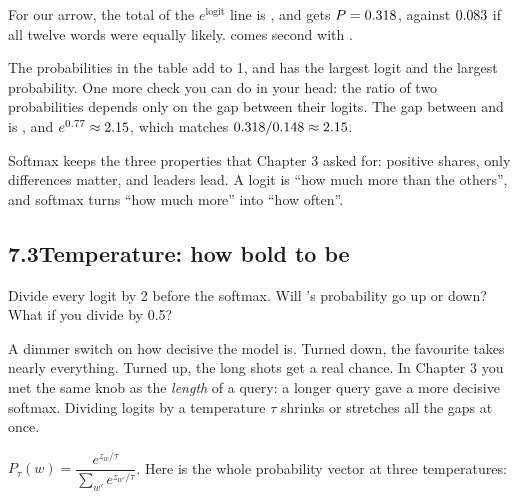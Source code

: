 For our arrow, the total of the $e^{\text{logit}}$ line is \nSevenExpSum, and  gets
$P=0.318$, against $0.083$ if all twelve words were equally likely. \tok{\nSevenSecond} comes
second with \nSevenPBeen.

\Sanity The probabilities in the table add to 1, and  has the largest logit and the largest
probability. One more check you can do in your head: the ratio of two probabilities depends only on the gap
between their logits. The gap between  and \tok{\nSevenSecond} is \nSevenGap, and
$e^{0.77}\approx2.15$, which matches $0.318/0.148\approx2.15$.

\Why Softmax keeps the three properties that Chapter 3 asked for: positive shares, only differences matter, and
leaders lead. A logit is ``how much more than the others'', and softmax turns ``how much more'' into ``how
often''.


\subsection*{7.3\quad Temperature: how bold to be}

\Predict Divide every logit by 2 before the softmax. Will 's probability go up or down? What if you
divide by 0.5?

\Picture A dimmer switch on how decisive the model is. Turned down, the favourite takes nearly everything. Turned
up, the long shots get a real chance. In Chapter 3 you met the same knob as the \emph{length} of a query: a longer
query gave a more decisive softmax. Dividing logits by a temperature $\tau$ shrinks or stretches all the gaps at
once.

\Exactly $P_\tau(w)=\dfrac{e^{z_w/\tau}}{\sum_{w'} e^{z_{w'}/\tau}}$. Here is the whole probability vector at
three temperatures:

\par\medskip\noindent\begin{minipage}{\linewidth}\centering

\end{minipage}\par\medskip

